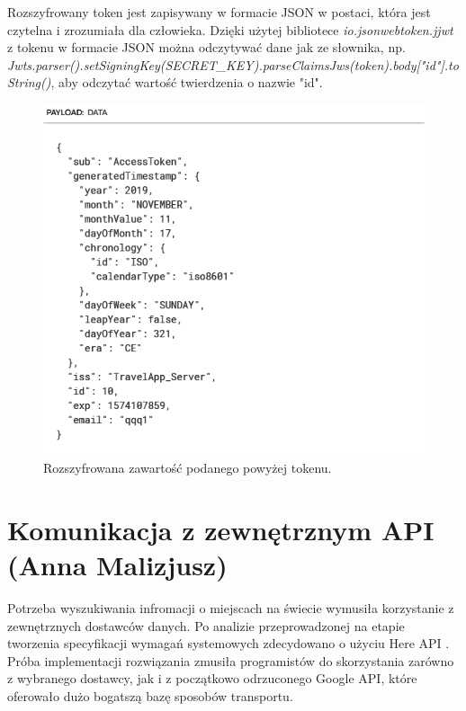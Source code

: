 \documentclass[10pt,twoside,a4paper]{report}
\begin{document}
\par Rozszyfrowany token jest zapisywany w formacie JSON w postaci, która jest czytelna i zrozumiała dla człowieka. Dzięki użytej bibliotece \textit{io.jsonwebtoken.jjwt} z tokenu w formacie JSON można odczytywać dane jak ze słownika, np. 
\textit{Jwts.parser().setSigningKey(SECRET\_KEY).parseClaimsJws(token).body["id"].toString()}, aby odczytać wartość twierdzenia o nazwie "id".

\begin{figure}[h]
\centering
\includegraphics[width=\linewidth]{tokenPayload}
\caption{Rozszyfrowana zawartość podanego powyżej tokenu.}
\label{fig:tokenPayload}
\end{figure}
\FloatBarrier


\section{Komunikacja z zewnętrznym API (Anna Malizjusz)}
\par Potrzeba wyszukiwania infromacji o miejscach na świecie wymusiła korzystanie z zewnętrznych dostawców danych. Po analizie przeprowadzonej na etapie tworzenia specyfikacji wymagań systemowych zdecydowano o użyciu Here API \cite{HereApi}. Próba implementacji rozwiązania zmusiła programistów do skorzystania zarówno z wybranego dostawcy, jak i z początkowo odrzuconego Google API\cite{GoogleApi}, które oferowało dużo bogatszą bazę sposobów transportu.
\end{document}
